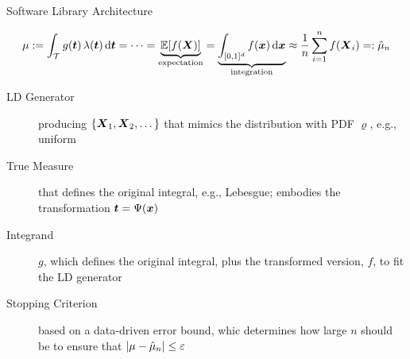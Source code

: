 \documentclass[11pt,compress,xcolor={usenames,dvipsnames},aspectratio=169]{beamer}
\begin{document}
\begin{frame}{Software Library Architecture}
	\vspace{-7ex}

\[
\mu :=  \int_{\mathcal{T}} g(\boldsymbol{t}) \, \lambda(\boldsymbol{t}) \, {\rm d} \boldsymbol{t} = \cdots = 	
\underbrace{\operatorname{\mathbb{E}}[f(\boldsymbol{X})]}_{\text{expectation}} = \underbrace{\int_{[0,1]^d}  f(\boldsymbol{x}) \, {\rm d} \boldsymbol{x}}_{\text{integration}} \approx  \frac 1{n} \sum_{i=1}^{n} f(\boldsymbol{X}_i) =: \hat{\mu}_{n}
\]

\vspace{-3ex}

\begin{description}
	
	\item[LD Generator] producing $\{\boldsymbol{X}_1, \boldsymbol{X}_2, \dots \}$ that mimics the distribution with PDF $\varrho$, e.g., uniform
	
	\item[True Measure] that defines the original integral, e.g., Lebesgue; embodies the transformation $\boldsymbol{t} = \Psi(\boldsymbol{x})$
	
	\item[Integrand] $g$, which defines the original integral, plus the transformed version, $f$, to fit the LD generator 
	
	\item[Stopping Criterion] based on a data-driven error bound, whic determines how large $n$ should be to ensure that $\left \lvert \mu - \hat{\mu}_n \right \rvert \le \varepsilon$
\end{description}

\vspace{-1ex}
\end{frame}
\end{document}
